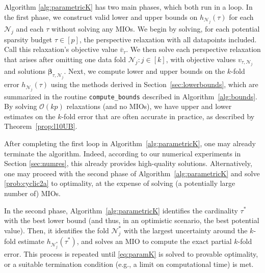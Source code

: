 \documentclass[ijoc,noblindrev]{informs3} %
\let\footnote=\endnote
\begin{document}

{Algorithm \ref{alg:parametricK} has two main phases, which both run in a loop. In the first phase, we construct valid lower and upper bounds on $h_{\mathcal{N}_j}(\tau)$ for each $\mathcal{N}_j$ and each $\tau$ without solving any MIOs. We begin by solving, for each potential sparsity budget $\tau\in [p]$, the perspective relaxation with all datapoints included. Call this relaxation's objective value $\bar v_{\tau}$. We then solve each perspective relaxation that arises after omitting one data fold $\mathcal{N}_j: j \in [k]$, with objective values $v_{\tau,\mathcal{N}_j}$ and solutions $\bm{\beta}_{\tau,\mathcal{N}_j}$. %
Next, we compute lower and upper bounds on the $k$-fold error $h_{\mathcal{N}_j}(\tau)$ using the methods derived in Section~\ref{sec:lowerbounds}, which are summarized in the routine \texttt{compute\_bounds} described in Algorithm~\ref{alg:bounds}. By solving $\mathcal{O}(kp)$ relaxations (and no MIOs), we have upper and lower estimates on the $k$-fold error that are often accurate in practice, as described by Theorem~\ref{prop:l10UB}. 

After completing the first loop in Algorithm~\ref{alg:parametricK}, one may already terminate the algorithm. Indeed, according to our numerical experiments in Section \ref{sec:numres}, this already provides high-quality solutions. Alternatively, one may proceed with the second phase of Algorithm~\ref{alg:parametricK} and solve \eqref{prob:cyclic2a} to optimality, at the expense of solving (a potentially large number of) MIOs.

In the second phase, Algorithm~\ref{alg:parametricK} identifies the cardinality $\tau^*$ with the best lower bound (and thus, in an optimistic scenario, the best potential value). Then, it identifies the fold $\mathcal{N}_j^*$ with the largest uncertainty around the $k$-fold estimate $h_{\mathcal{N}_j^*}(\tau^*)$, and solves an MIO to compute the exact partial $k$-fold error. %
This process is repeated until \eqref{eq:paramK} is solved to provable optimality, or a suitable termination condition (e.g., a limit on computational time) %
is met. %
}
\end{document}
